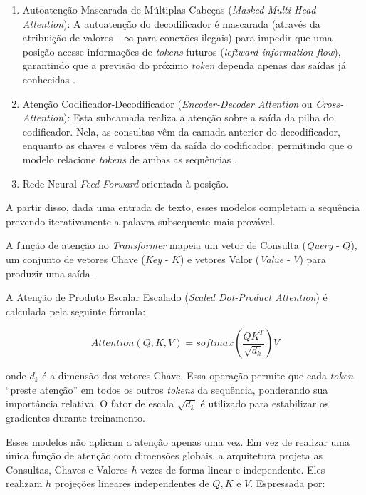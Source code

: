 \documentclass[
    12pt,                %
    openright,           %
    oneside,             %
    a4paper,             %
    english,             %
    brazil               %
]{abntex2}
\begin{document}
\begin{itemize}
\begin{enumerate}
  \item Autoatenção Mascarada de Múltiplas Cabeças (\textit{Masked Multi-Head Attention}):
A autoatenção do decodificador é mascarada (através da atribuição de valores $-\infty$ para conexões ilegais) para impedir que uma posição acesse informações de \textit{tokens} futuros (\textit{leftward information flow}), garantindo que a previsão do próximo \textit{token} dependa apenas das saídas já conhecidas \cite{vaswani2017attention, tunstall2022natural}.
  \item Atenção Codificador-Decodificador (\textit{Encoder-Decoder Attention} ou \textit{Cross-Attention}):
Esta subcamada realiza a atenção sobre a saída da pilha do codificador.
Nela, as consultas vêm da camada anterior do decodificador, enquanto as chaves e valores vêm da saída do codificador, permitindo que o modelo relacione \textit{tokens} de ambas as sequências \cite{vaswani2017attention, tunstall2022natural, jurafsky2026speech}.
  \item Rede Neural \textit{Feed-Forward} orientada à posição.
\end{enumerate}

\par
A partir disso, dada uma entrada de texto, esses modelos completam a sequência prevendo iterativamente a palavra subsequente mais provável.
\end{itemize}

\par
A função de atenção no \textit{Transformer} mapeia um vetor de Consulta (\textit{Query} - $Q$), um conjunto de vetores Chave (\textit{Key} - $K$) e vetores Valor (\textit{Value} - $V$) para produzir uma saída \cite{vaswani2017attention, tunstall2022natural}.
\par
A Atenção de Produto Escalar Escalado (\textit{Scaled Dot-Product Attention}) é calculada pela seguinte fórmula:

\begin{equation}
  Attention(Q, K, V) = softmax\left(\frac{QK^T}{\sqrt{d_k}}\right)V 
\end{equation}

\par
onde $d_{k}$ é a dimensão dos vetores Chave. Essa operação permite que cada \textit{token} ``preste atenção'' em todos os outros \textit{tokens} da sequência, ponderando sua importância relativa.
O fator de escala $\sqrt{d_k}$ é utilizado para estabilizar os gradientes durante treinamento.
\par
Esses modelos não aplicam a atenção apenas uma vez.
Em vez de realizar uma única função de atenção com dimensões globais, a arquitetura projeta as Consultas, Chaves e Valores $h$ vezes de forma linear e independente.
Eles realizam $h$ projeções lineares independentes de $Q, K$ e $V$.
Espressada por:
\end{document}

